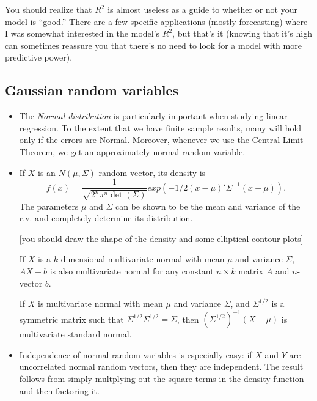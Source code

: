 \begin{itemize}
  You should realize that $R^2$ is almost useless as a guide to whether
  or not your model is ``good.''  There are a few specific
  applications (mostly forecasting) where I was somewhat interested in
  the model's $R^2$, but that's it (knowing that it's high can
  sometimes reassure you that there's no need to look for a model with
  more predictive power).

\end{itemize}

\subsection{Gaussian random variables}

\begin{itemize}

\item The \emph{Normal distribution} is particularly important when
  studying linear regression.  To the extent that we have finite
  sample results, many will hold only if the errors are Normal.
  Moreover, whenever we use the Central Limit Theorem, we get an
  approximately normal random variable.

\item If $X$ is an $N(\mu, \Sigma)$ random vector, its density is
  \begin{equation*}
    f(x) = \frac{1}{\sqrt{2^n \pi^n \det(\Sigma)}} exp(-1/2(x - \mu)'\Sigma^{-1}(x- \mu)).
  \end{equation*}
  The parameters $\mu$ and $\Sigma$ can be shown to be the mean and variance
  of the r.v. and completely determine its distribution.

  [you should draw the shape of the density and some elliptical
  contour plots]

  If $X$ is a $k$-dimensional multivariate normal with mean $\mu$
  and variance $\Sigma$, $A X + b$ is also multivariate normal for any
  constant $n \times k$ matrix $A$ and $n$-vector $b$.

  If $X$ is multivariate normal with mean $\mu$ and variance $\Sigma$,
  and $\Sigma^{1/2}$ is a symmetric matrix such that $\Sigma^{1/2} \Sigma^{1/2} = \Sigma$,
  then $(\Sigma^{1/2})^{-1} (X - \mu)$ is multivariate standard normal.

\item Independence of normal random variables is especially easy: if
  $X$ and $Y$ are uncorrelated normal random vectors, then they are
  independent.  The result follows from simply multplying out the
  square terms in the density function and then factoring it.


\end{itemize}
